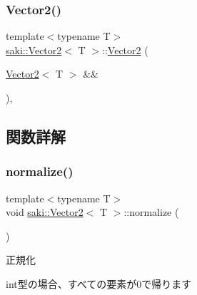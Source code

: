 \mbox{\label{classsaki_1_1_vector2_ade059efe536b29346642aacbd973d062}} 
\subsubsection{\texorpdfstring{Vector2()}{Vector2()}\hspace{0.1cm}{\footnotesize\ttfamily [5/5]}}
{\footnotesize\ttfamily template$<$typename T$>$ \\
\mbox{\hyperlink{classsaki_1_1_vector2}{saki\+::\+Vector2}}$<$ T $>$\+::\mbox{\hyperlink{classsaki_1_1_vector2}{Vector2}} (\begin{DoxyParamCaption}\item[{\mbox{\hyperlink{classsaki_1_1_vector2}{Vector2}}$<$ T $>$ \&\&}]{ }\end{DoxyParamCaption})\hspace{0.3cm}{\ttfamily [default]}, {\ttfamily [noexcept]}}



\subsection{関数詳解}
\mbox{\label{classsaki_1_1_vector2_a8267f8608ffad9796813856c05076d8c}} 
\subsubsection{\texorpdfstring{normalize()}{normalize()}}
{\footnotesize\ttfamily template$<$typename T$>$ \\
void \mbox{\hyperlink{classsaki_1_1_vector2}{saki\+::\+Vector2}}$<$ T $>$\+::normalize (\begin{DoxyParamCaption}{ }\end{DoxyParamCaption})\hspace{0.3cm}{\ttfamily [inline]}}



正規化 

int型の場合、すべての要素が0で帰ります \mbox{\label{classsaki_1_1_vector2_aab202f42563239dfb59d27295d6c7462}} 
